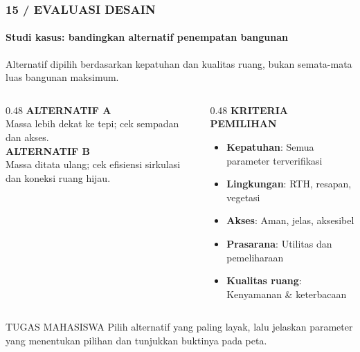 \documentclass[../main.tex]{subfiles}
\begin{document}
\begin{frame}[mytitle=standard,t]
	\frametitle{15 / EVALUASI DESAIN}
	\framesubtitle{Studi kasus: bandingkan alternatif penempatan bangunan}

	Alternatif dipilih berdasarkan kepatuhan dan kualitas ruang, bukan semata-mata luas bangunan maksimum.

	\vspace{0.2cm}
	\begin{columns}[T]
		\begin{column}{0.48\textwidth}
			\textbf{ALTERNATIF A}\\
			Massa lebih dekat ke tepi; cek sempadan dan akses.\\[1em]
			\textbf{ALTERNATIF B}\\
			Massa ditata ulang; cek efisiensi sirkulasi dan koneksi ruang hijau.
		\end{column}

		\begin{column}{0.48\textwidth}
			\textbf{KRITERIA PEMILIHAN}
			\begin{itemize}
				\item \textbf{Kepatuhan}: Semua parameter terverifikasi
				\item \textbf{Lingkungan}: RTH, resapan, vegetasi
				\item \textbf{Akses}: Aman, jelas, aksesibel
				\item \textbf{Prasarana}: Utilitas dan pemeliharaan
				\item \textbf{Kualitas ruang}: Kenyamanan \& keterbacaan
			\end{itemize}
		\end{column}
	\end{columns}

	\begin{block}{TUGAS MAHASISWA}
		Pilih alternatif yang paling layak, lalu jelaskan parameter yang menentukan pilihan dan tunjukkan buktinya pada peta.
	\end{block}
\end{frame}
\end{document}
